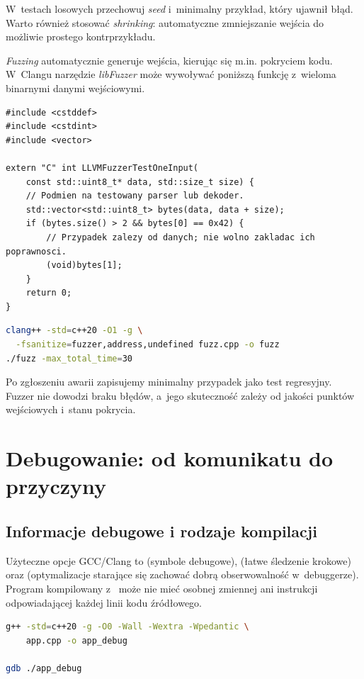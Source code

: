 W~testach losowych przechowuj \emph{seed} i~minimalny przykład,
który ujawnił błąd. Warto również stosować \emph{shrinking}:
automatyczne zmniejszanie wejścia do możliwie prostego kontrprzykładu.

\emph{Fuzzing} automatycznie generuje wejścia, kierując się m.in.
pokryciem kodu. W~Clangu narzędzie \emph{libFuzzer} może wywoływać
poniższą funkcję z~wieloma binarnymi danymi wejściowymi.

\begin{lstlisting}[caption={Minimalny punkt wejsciowy dla libFuzzer (Clang).}]
#include <cstddef>
#include <cstdint>
#include <vector>

extern "C" int LLVMFuzzerTestOneInput(
    const std::uint8_t* data, std::size_t size) {
    // Podmien na testowany parser lub dekoder.
    std::vector<std::uint8_t> bytes(data, data + size);
    if (bytes.size() > 2 && bytes[0] == 0x42) {
        // Przypadek zalezy od danych; nie wolno zakladac ich poprawnosci.
        (void)bytes[1];
    }
    return 0;
}
\end{lstlisting}

\begin{lstlisting}[language=bash,caption={Budowanie harnessu fuzzingu w Clangu.}]
clang++ -std=c++20 -O1 -g \
  -fsanitize=fuzzer,address,undefined fuzz.cpp -o fuzz
./fuzz -max_total_time=30
\end{lstlisting}

Po zgłoszeniu awarii zapisujemy minimalny przypadek jako test
regresyjny. Fuzzer nie dowodzi braku błędów, a~jego skuteczność zależy
od jakości punktów wejściowych i~stanu pokrycia.

\section{Debugowanie: od komunikatu do przyczyny}
\label{sec:cpp18-debug}

\subsection{Informacje debugowe i rodzaje kompilacji}

Użyteczne opcje GCC/Clang to  (symbole debugowe),
 (łatwe śledzenie krokowe) oraz  (optymalizacje
starające się zachować dobrą obserwowalność w~debuggerze). Program
kompilowany z~\code{-O2} może nie mieć osobnej zmiennej ani instrukcji
odpowiadającej każdej linii kodu źródłowego.

\begin{lstlisting}[language=bash,caption={Budowanie programu do debugowania.}]
g++ -std=c++20 -g -O0 -Wall -Wextra -Wpedantic \
    app.cpp -o app_debug

gdb ./app_debug
\end{lstlisting}

